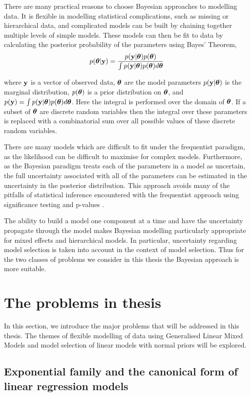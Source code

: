 There are many practical reasons to choose Bayesian approaches to modelling
data. It is flexible in modelling statistical complications, such as missing or
hierarchical data, and complicated models can be built by chaining together
multiple levels of simple models. These models can then be fit to data by
calculating the posterior probability of the parameters using Bayes' Theorem,
\[
	p({\boldsymbol \theta} | {\bf y}) = \frac{p({\bf y} | {\boldsymbol \theta}) p({\boldsymbol \theta})}{\int p({\bf y} | {\boldsymbol \theta}) p({\boldsymbol \theta}) d {\boldsymbol \theta}}
\]

where ${\bf y}$ is a vector of observed data, ${\boldsymbol \theta}$ are the model parameters
$p({\bf y}|{\boldsymbol \theta})$ is the marginal distribution, $p({\boldsymbol \theta})$ is a prior
distribution on ${\boldsymbol \theta}$, and $p({\bf y})=\int p({\bf y}|{\boldsymbol \theta})p({\boldsymbol \theta})d{\boldsymbol \theta}$.
Here the integral is performed over the domain of ${\boldsymbol \theta}$. If a subset of
${\boldsymbol \theta}$ are discrete random variables then the integral over these parameters
is replaced with a combinatorial sum over all possible values of these discrete
random variables.

There are many models which are difficult to fit under the frequentist paradigm,
as the likelihood can be difficult to maximise for complex models. Furthermore,
as the Bayesian paradigm treats each of the parameters in a model as uncertain,
the full uncertainty associated with all of the parameters can be estimated in
the uncertainty in the posterior distribution. This approach avoids many of the
pitfalls of statistical inference encountered with the frequentist approach
using significance testing and p-values \citep{Cox2005}.

The ability to build a model one component at a time and have the uncertainty
propagate through the model makes Bayesian modelling  particularly appropriate
for mixed effects and hierarchical models. In particular, uncertainty regarding
model selection is taken into account in the context of model selection. Thus
for the two classes of problems we consider in this thesis the Bayesian approach
is more suitable.

\section{The problems in thesis}

In this section, we introduce the major problems that will be addressed in this
thesis. The themes of flexible modelling of data using Generalised Linear Mixed
Models and model selection of linear models with normal priors  will be
explored.

\subsection{Exponential family and the canonical form of linear regression
models}

